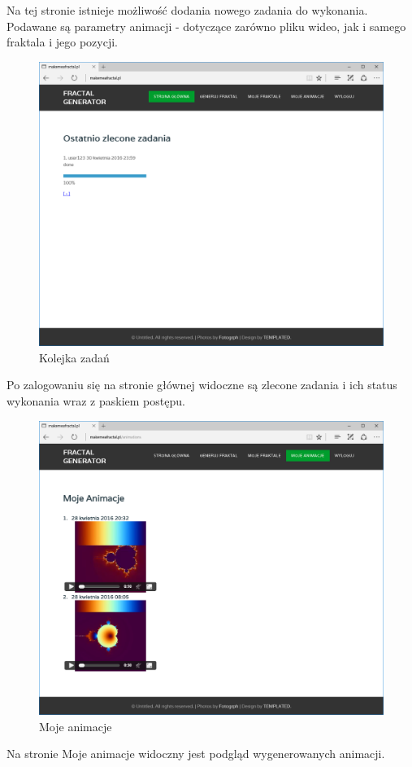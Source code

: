 \documentclass[a4paper]{article}
\begin{document}
Na tej stronie istnieje możliwość dodania nowego zadania do wykonania. Podawane są parametry animacji - dotyczące zarówno pliku wideo, jak i samego fraktala i jego pozycji.
\begin{figure}[H]
    \centering
    \includegraphics[width=\textwidth]{queue_page.png}
    \caption{Kolejka zadań}
    \label{fig:queue_page}
\end{figure}
Po zalogowaniu się na stronie głównej widoczne są zlecone zadania i ich status wykonania wraz z paskiem postępu.
\begin{figure}[H]
    \centering
    \includegraphics[width=\textwidth]{my_frac.png}
    \caption{Moje animacje}
    \label{fig:my_frac}
\end{figure}
Na stronie Moje animacje widoczny jest podgląd wygenerowanych animacji.
\end{document}
